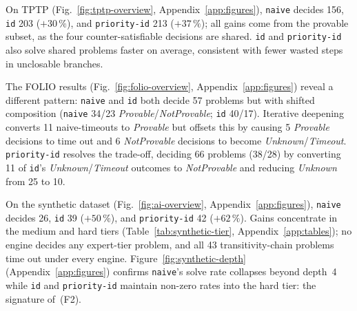 On TPTP (Fig.~\ref{fig:tptp-overview}, Appendix~\ref{app:figures}),
\texttt{naive} decides 156, \texttt{id} 203 ($+30\,\%$), and
\texttt{priority-id} 213 ($+37\,\%$); all gains come from the provable
subset, as the four counter-satisfiable decisions are shared.
\texttt{id} and \texttt{priority-id} also solve shared problems faster
on average, consistent with fewer wasted steps in unclosable branches.

The FOLIO results (Fig.~\ref{fig:folio-overview},
Appendix~\ref{app:figures}) reveal a different pattern: \texttt{naive}
and \texttt{id} both decide 57 problems but with shifted composition
(\texttt{naive} 34/23 \textit{Provable}/\textit{NotProvable};
\texttt{id} 40/17). Iterative deepening converts 11 naive-timeouts to
\textit{Provable} but offsets this by causing 5 \textit{Provable}
decisions to time out and 6 \textit{NotProvable} decisions to become
\textit{Unknown}/\textit{Timeout}. \texttt{priority-id} resolves the
trade-off, deciding 66 problems (38/28) by converting 11 of \texttt{id}'s
\textit{Unknown}/\textit{Timeout} outcomes to \textit{NotProvable} and
reducing \textit{Unknown} from 25 to 10.

On the synthetic dataset (Fig.~\ref{fig:ai-overview},
Appendix~\ref{app:figures}), \texttt{naive} decides 26, \texttt{id} 39
($+50\,\%$), and \texttt{priority-id} 42 ($+62\,\%$). Gains concentrate in the medium and hard tiers
(Table~\ref{tab:synthetic-tier}, Appendix~\ref{app:tables}); no engine
decides any expert-tier problem, and all 43 transitivity-chain problems
time out under every engine. Figure~\ref{fig:synthetic-depth}
(Appendix~\ref{app:figures}) confirms \texttt{naive}'s solve rate
collapses beyond depth~4 while \texttt{id} and \texttt{priority-id}
maintain non-zero rates into the hard tier: the signature of~(F2).
